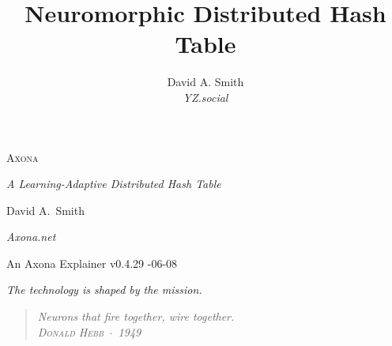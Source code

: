 \documentclass[nobib]{tufte-handout}
\title{Neuromorphic Distributed Hash Table}
\author[David A. Smith]{David A. Smith \\[0.3em] \emph{\small YZ.social}}
\date{}
\begin{document}

\thispagestyle{empty}
\null\vfill
\begin{center}
{\fontsize{48}{52}\selectfont \textsc{Axona}\par}
\vspace{0.6em}
{\Large\itshape A Learning-Adaptive Distributed Hash Table\par}
\vspace{4em}
{\large David A.~Smith\par}
{\itshape\small Axona.net\par}
\vspace{2em}
{\small An Axona Explainer \quad v0.4.29 -06-08\par}
\end{center}
\vfill
\null
\newpage

\thispagestyle{empty}
\null\vfill
\begin{flushright}
\itshape The technology is shaped by the mission.\par
\end{flushright}
\vfill
\null\newpage

\pagestyle{ndhtplain}
\thispagestyle{ndhtplain}
\setcounter{page}{1}

\begin{quote}
  \itshape Neurons that fire together, wire together.\\[0.3em]
  \normalfont\textsc{\footnotesize Donald Hebb} \,$\cdot$\, 1949
\end{quote}
\end{document}
